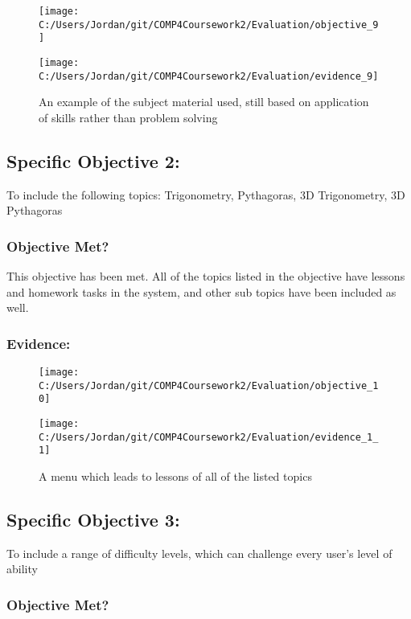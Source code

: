 \begin{figure}[H]
	\texttt{[image: C:/Users/Jordan/git/COMP4Coursework2/Evaluation/objective\_9]}
\end{figure}

\begin{figure}[H]
	\texttt{[image: C:/Users/Jordan/git/COMP4Coursework2/Evaluation/evidence\_9]}
	\caption{An example of the subject material used, still based on application of skills rather than problem solving}
\end{figure}

\subsection{Specific Objective 2: }

To include the following topics: Trigonometry, Pythagoras, 3D Trigonometry, 3D Pythagoras

\subsubsection{Objective Met?}

This objective has been met. All of the topics listed in the objective have lessons and homework tasks in the system, and other sub topics have been included as well.

\subsubsection{Evidence: }

\begin{figure}[H]
	\texttt{[image: C:/Users/Jordan/git/COMP4Coursework2/Evaluation/objective\_10]}
\end{figure}

\begin{figure}[H]
	\texttt{[image: C:/Users/Jordan/git/COMP4Coursework2/Evaluation/evidence\_1\_1]}
	\caption{A menu which leads to lessons of all of the listed topics}
\end{figure}

\subsection{Specific Objective 3: }

To include a range of difficulty levels, which can challenge every user's level of ability

\subsubsection{Objective Met?}

